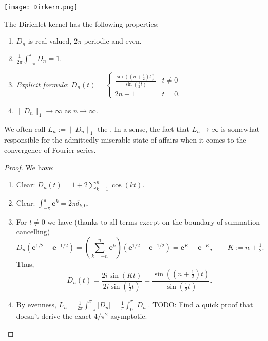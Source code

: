 \begin{center}
\texttt{[image: Dirkern.png]}
\end{center}

\begin{theorem}[properties]
The Dirichlet kernel has the following properties:
\begin{enumerate}
\item $D_n$ is real-valued, $2\pi$-periodic and even.
\item $\displaystyle \frac{1}{2\pi} \int_{-\pi}^{\pi} D_n = 1$.
\item \emph{Explicit formula}: $\displaystyle D_n(t) = \begin{cases} \frac{\sin((n+\tfrac{1}{2})t)}{\sin(\tfrac{1}{2}t)} & t \neq 0 \\ 2n+1 & t=0. \end{cases}$
\item $\| D_n \|_1 \to \infty$ as $n \to \infty$.
\end{enumerate}
\end{theorem}

We often call $L_n := \| D_n \|_1$ the . In a sense, the fact that $L_n \to \infty$ is somewhat responsible for the admittedly miserable state of affairs when it comes to the convergence of Fourier series.

\begin{proof}
We have:
\begin{enumerate}
\item Clear: $D_n(t) = 1 + 2 \sum_{k=1}^n \cos(kt)$.
\item Clear: $\int_{-\pi}^\pi \mathbf{e}^k = 2 \pi \delta_{k,0}$.
\item For $t \neq 0$ we have (thanks to all terms except on the boundary of summation cancelling) %
\[ D_n (\mathbf{e}^{1/2} - \mathbf{e}^{-1/2}) = \left( \sum_{k=-n}^n \mathbf{e}^k \right) (\mathbf{e}^{1/2} - \mathbf{e}^{-1/2}) = \mathbf{e}^K - \mathbf{e}^{-K}, \qquad K := n + \tfrac{1}{2}. \]
Thus,
\[ D_n(t) = \frac{2i \sin(Kt)}{2i \sin(\tfrac{1}{2}t)} = \frac{\sin((n+\tfrac{1}{2})t)}{\sin(\tfrac{1}{2}t)}. \]
\item By evenness, $L_n = \frac{1}{2\pi} \int_{-\pi}^\pi |D_n| = \frac{1}{\pi} \int_0^\pi |D_n|$. {\color{red}TODO: Find a quick proof that doesn't derive the exact $4/\pi^2$ asymptotic.} \qedhere
\end{enumerate}
\end{proof}

